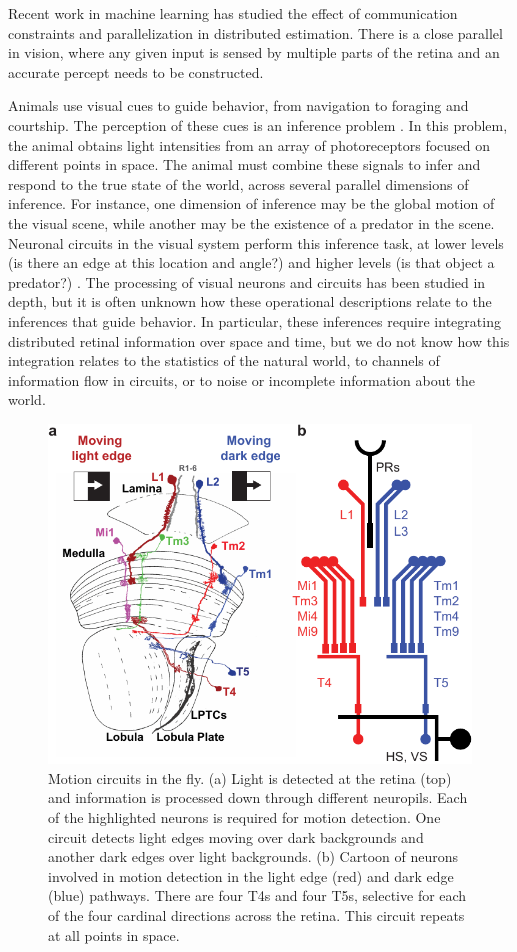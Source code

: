 
\label{sec:aim1}

Recent work in machine learning has studied the effect of
communication constraints and parallelization in distributed
estimation. There is a close parallel in vision, where any given input
is sensed by multiple parts of the retina and an accurate percept
needs to be constructed.

\biobackground{}
Animals use visual cues to guide behavior, from navigation to
foraging and courtship. The perception of these cues is an
inference problem \citep{knill:96}. In this problem, the
animal obtains light intensities from an array of
photoreceptors focused on different points in space. The animal must
combine these signals to infer
and respond to the true state of the world, across several
parallel dimensions of inference. For instance, one dimension of
inference may be the global motion of the visual scene, while
another may be the existence of a predator in the
scene. Neuronal circuits in the visual system perform this
inference task, at lower levels (is there an edge at this location
and angle?) and higher levels (is that object a predator?)
\citep{simoncelli:01}. The processing of 
visual neurons and circuits has been studied in depth, but it is
often unknown how these operational descriptions relate to the
inferences that guide behavior. In particular, these inferences
require integrating distributed retinal information over space and
time, but we do not know how this integration relates to the
statistics of the natural world, to channels of information flow
in circuits, or to noise or incomplete information about the world.


\setlength{\columnsep}{20pt}
\begin{figure}
\centering
\includegraphics[width=.44\textwidth]{figs/flysetup}
\caption{\small Motion circuits in the fly. (a) Light is detected at the
retina (top) and information is processed
down through different neuropils. Each of the highlighted
neurons is required for motion detection. One circuit 
detects light edges moving over dark backgrounds and another 
dark edges over light backgrounds. (b) Cartoon of
neurons involved in motion detection in the light edge
(red) and dark edge (blue) pathways. 
There are four T4s and four T5s, selective for each
of the four cardinal directions across the retina. This circuit repeats at all
points in space.}
    \label{fig:setup}
    \vskip-10pt
\end{figure}



